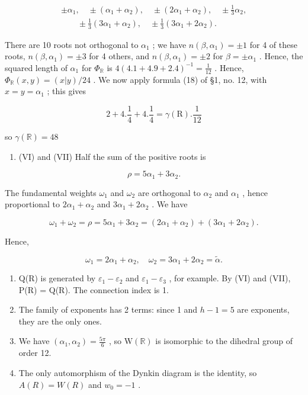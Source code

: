 \[
\begin{array}{l} \pm \alpha_ {1}, \quad \pm (\alpha_ {1} + \alpha_ {2}), \quad \pm (2 \alpha_ {1} + \alpha_ {2}), \quad \pm \frac {1}{3} \alpha_ {2}, \\ \qquad \pm \frac {1}{3} (3 \alpha_ {1} + \alpha_ {2}), \quad \pm \frac {1}{3} (3 \alpha_ {1} + 2 \alpha_ {2}). \end{array}
\]

There are 10 roots not orthogonal to \(\alpha_{1}\) ; we have \(n(\beta, \alpha_{1}) = \pm 1\) for 4 of these roots, \(n(\beta, \alpha_{1}) = \pm 3\) for 4 others, and \(n(\beta, \alpha_{1}) = \pm 2\) for \(\beta = \pm \alpha_{1}\) . Hence, the squared length of \(\alpha_{1}\) for \(\Phi_{\mathbb{R}}\) is \(4(4.1 + 4.9 + 2.4)^{-1} = \frac{1}{12}\) . Hence, \(\Phi_{\mathbb{R}}(x, y) = (x|y)/24\) . We now apply formula (18) of §1, no. 12, with \(x = y = \alpha_{1}\) ; this gives

\[
2 + 4. \frac {1}{4} + 4. \frac {1}{4} = \gamma (\mathrm{R}). \frac {1}{12}
\]

so \(\gamma (\mathbb{R}) = 48\)

\begin{enumerate}
\def\labelenumi{(\Roman{enumi})}
\setcounter{enumi}{5}
\tightlist
\item
  (VI) and (VII) Half the sum of the positive roots is
\end{enumerate}

\[
\rho = 5 \alpha_ {1} + 3 \alpha_ {2}.
\]

The fundamental weights \(\omega_{1}\) and \(\omega_{2}\) are orthogonal to \(\alpha_{2}\) and \(\alpha_{1}\) , hence proportional to \(2\alpha_{1} + \alpha_{2}\) and \(3\alpha_{1} + 2\alpha_{2}\) . We have

\[
\omega_ {1} + \omega_ {2} = \rho = 5 \alpha_ {1} + 3 \alpha_ {2} = (2 \alpha_ {1} + \alpha_ {2}) + (3 \alpha_ {1} + 2 \alpha_ {2}).
\]

Hence,

\[
\omega_ {1} = 2 \alpha_ {1} + \alpha_ {2}, \quad \omega_ {2} = 3 \alpha_ {1} + 2 \alpha_ {2} = \tilde {\alpha}.
\]

\begin{enumerate}
\def\labelenumi{(\Roman{enumi})}
\setcounter{enumi}{7}
\item
  Q(R) is generated by \(\varepsilon_{1}-\varepsilon_{2}\) and \(\varepsilon_{1}-\varepsilon_{3}\) , for example. By (VI) and (VII), P(R) = Q(R). The connection index is 1.
\item
  The family of exponents has 2 terms: since 1 and \(h - 1 = 5\) are exponents, they are the only ones.
\item
  We have \((\alpha_{1},\alpha_{2}) = \frac{5\pi}{6}\) , so \(\mathrm{W}(\mathbb{R})\) is isomorphic to the dihedral group of order 12.
\item
  The only automorphism of the Dynkin diagram is the identity, so \(A(R) = W(R)\) and \(w_{0} = -1\) .
\end{enumerate}

